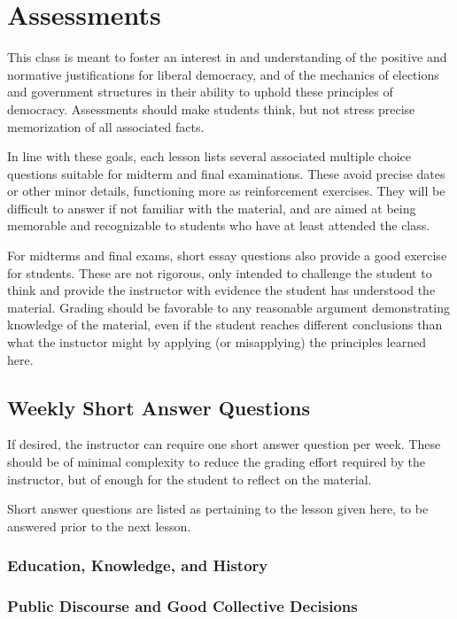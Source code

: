 \chapter{Assessments}

This class is meant to foster an interest in and understanding of the positive and normative justifications for liberal democracy, and of the mechanics of elections and government structures in their ability to uphold these principles of democracy.  Assessments should make students think, but not stress precise memorization of all associated facts.

In line with these goals, each lesson lists several associated multiple choice questions suitable for midterm and final examinations.  These avoid precise dates or other minor details, functioning more as reinforcement exercises.  They will be difficult to answer if not familiar with the material, and are aimed at being memorable and recognizable to students who have at least attended the class.

For midterms and final exams, short essay questions also provide a good exercise for students.  These are not rigorous, only intended to challenge the student to think and provide the instructor with evidence the student has understood the material.  Grading should be favorable to any reasonable argument demonstrating knowledge of the material, even if the student reaches different conclusions than what the instuctor might by applying (or misapplying) the principles learned here.

\section{Weekly Short Answer Questions}

If desired, the instructor can require one short answer question per week.  These should be of minimal complexity to reduce the grading effort required by the instructor, but of enough for the student to reflect on the material.

Short answer questions are listed as pertaining to the lesson given here, to be answered prior to the next lesson.

\subsection{Education, Knowledge, and History}


\subsection{Public Discourse and Good Collective Decisions}

